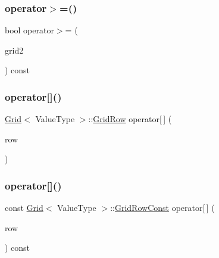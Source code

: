 \mbox{\label{classGrid_a21431c500035c200656a8d67e96531c7}} 
\subsubsection{\texorpdfstring{operator$>$=()}{operator>=()}}
{\footnotesize\ttfamily bool operator$>$= (\begin{DoxyParamCaption}\item[{const \mbox{\hyperlink{classGrid}{Grid}}$<$ Value\+Type $>$ \&}]{grid2 }\end{DoxyParamCaption}) const}

\mbox{\label{classGrid_aa62a62fb923c387dbec19d9559fea429}} 
\subsubsection{\texorpdfstring{operator[]()}{operator[]()}\hspace{0.1cm}{\footnotesize\ttfamily [1/4]}}
{\footnotesize\ttfamily \mbox{\hyperlink{classGrid}{Grid}}$<$ Value\+Type $>$\+::\mbox{\hyperlink{classGrid_1_1GridRow}{Grid\+Row}} operator\mbox{[}$\,$\mbox{]} (\begin{DoxyParamCaption}\item[{int}]{row }\end{DoxyParamCaption})}

\mbox{\label{classGrid_a8b881f7fb1e524d4cf2766bde140eeb1}} 
\subsubsection{\texorpdfstring{operator[]()}{operator[]()}\hspace{0.1cm}{\footnotesize\ttfamily [2/4]}}
{\footnotesize\ttfamily const \mbox{\hyperlink{classGrid}{Grid}}$<$ Value\+Type $>$\+::\mbox{\hyperlink{classGrid_1_1GridRowConst}{Grid\+Row\+Const}} operator\mbox{[}$\,$\mbox{]} (\begin{DoxyParamCaption}\item[{int}]{row }\end{DoxyParamCaption}) const}

